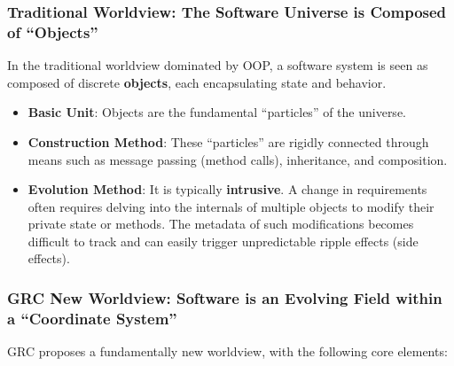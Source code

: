 \documentclass[11pt]{article}
\begin{document}
\subsubsection*{Traditional Worldview: The Software Universe is Composed of ``Objects''}

In the traditional worldview dominated by OOP, a software system is seen as composed of discrete \textbf{objects}, each encapsulating state and behavior.

\begin{itemize}
    \item \textbf{Basic Unit}: Objects are the fundamental ``particles'' of the universe.
    \item \textbf{Construction Method}: These ``particles'' are rigidly connected through means such as message passing (method calls), inheritance, and composition.
    \item \textbf{Evolution Method}: It is typically \textbf{intrusive}. A change in requirements often requires delving into the internals of multiple objects to modify their private state or methods. The metadata of such modifications becomes difficult to track and can easily trigger unpredictable ripple effects (side effects).
\end{itemize}

\subsubsection*{GRC New Worldview: Software is an Evolving Field within a ``Coordinate System''}

GRC proposes a fundamentally new worldview, with the following core elements:
\end{document}
